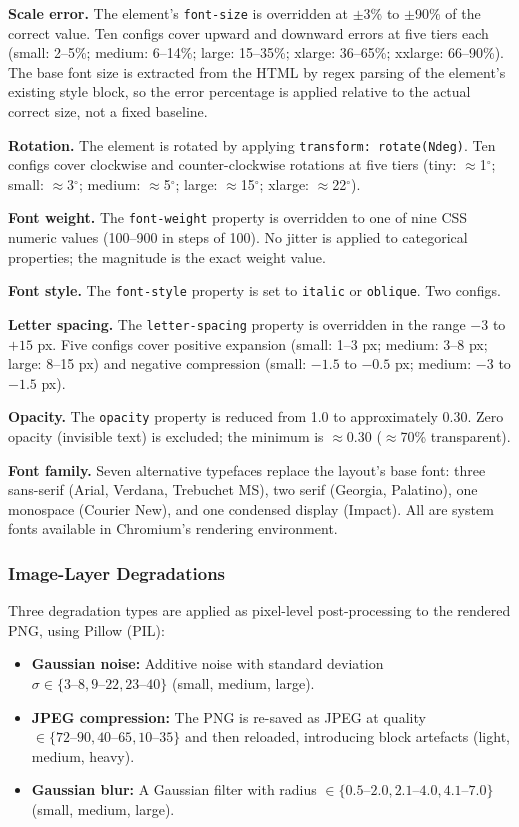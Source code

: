 \textbf{Scale error.} The element's \texttt{font-size} is overridden at $\pm$3\% to $\pm$90\% of the correct value. Ten configs cover upward and downward errors at five tiers each (small: 2--5\%; medium: 6--14\%; large: 15--35\%; xlarge: 36--65\%; xxlarge: 66--90\%). The base font size is extracted from the HTML by regex parsing of the element's existing style block, so the error percentage is applied relative to the actual correct size, not a fixed baseline.

\textbf{Rotation.} The element is rotated by applying \texttt{transform: rotate(Ndeg)}. Ten configs cover clockwise and counter-clockwise rotations at five tiers (tiny: $\approx$1$^\circ$; small: $\approx$3$^\circ$; medium: $\approx$5$^\circ$; large: $\approx$15$^\circ$; xlarge: $\approx$22$^\circ$).

\textbf{Font weight.} The \texttt{font-weight} property is overridden to one of nine CSS numeric values (100--900 in steps of 100). No jitter is applied to categorical properties; the magnitude is the exact weight value.

\textbf{Font style.} The \texttt{font-style} property is set to \texttt{italic} or \texttt{oblique}. Two configs.

\textbf{Letter spacing.} The \texttt{letter-spacing} property is overridden in the range $-3$ to $+15$ px. Five configs cover positive expansion (small: 1--3 px; medium: 3--8 px; large: 8--15 px) and negative compression (small: $-1.5$ to $-0.5$ px; medium: $-3$ to $-1.5$ px).

\textbf{Opacity.} The \texttt{opacity} property is reduced from 1.0 to approximately 0.30. Zero opacity (invisible text) is excluded; the minimum is $\approx$0.30 ($\approx$70\% transparent).

\textbf{Font family.} Seven alternative typefaces replace the layout's base font: three sans-serif (Arial, Verdana, Trebuchet MS), two serif (Georgia, Palatino), one monospace (Courier New), and one condensed display (Impact). All are system fonts available in Chromium's rendering environment.

\subsubsection{Image-Layer Degradations}

Three degradation types are applied as pixel-level post-processing to the rendered PNG, using Pillow (PIL):

\begin{itemize}
    \item \textbf{Gaussian noise:} Additive noise with standard deviation $\sigma \in \{3\text{--}8, 9\text{--}22, 23\text{--}40\}$ (small, medium, large).
    \item \textbf{JPEG compression:} The PNG is re-saved as JPEG at quality $\in \{72\text{--}90, 40\text{--}65, 10\text{--}35\}$ and then reloaded, introducing block artefacts (light, medium, heavy).
    \item \textbf{Gaussian blur:} A Gaussian filter with radius $\in \{0.5\text{--}2.0, 2.1\text{--}4.0, 4.1\text{--}7.0\}$ (small, medium, large).
\end{itemize}


